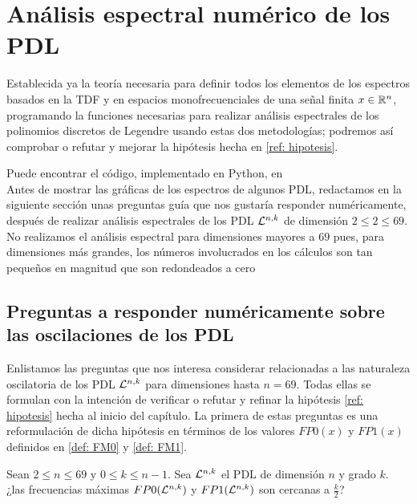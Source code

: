 \chapter{Análisis espectral numérico de los PDL}
\label{chap: resultados numericos analisis espectrales}

Establecida ya la teoría necesaria
para definir todos los elementos de los espectros
basados en la TDF y en espacios monofrecuenciales 
de una señal finita $x \in \mathbb{R}^{n}$,
programando la funciones necesarias para realizar análisis espectrales
de los polinomios discretos de Legendre
usando estas dos metodologías; podremos así
comprobar o refutar y mejorar
la hipótesis hecha en 
\ref{ref: hipotesis}. 

Puede encontrar el código, implementado en Python,
en  \\

Antes de mostrar las gráficas de los espectros
de algunos PDL, 
redactamos en la siguiente sección unas preguntas guía
que nos gustaría responder numéricamente, después de 
realizar análisis espectrales de los PDL
$\mathcal{L}^{n,k}$ de dimensión $2 \leq 2 \leq 69$. \\

No realizamos el análisis espectral para dimensiones
mayores a $69$ pues, para dimensiones más grandes, los números
involucrados en los cálculos son tan pequeños
en magnitud que son redondeados a cero

\section{Preguntas a responder numéricamente sobre las oscilaciones de los PDL}

Enlistamos las preguntas que nos interesa considerar
relacionadas a las naturaleza oscilatoria
de los PDL $\mathcal{L}^{n,k}$
para dimensiones hasta $n=69$. 
Todas ellas se formulan con la intención de 
verificar o refutar y refinar la 
hipótesis \ref{ref: hipotesis} 
hecha al inicio del capítulo. La primera
de estas preguntas es una reformulación
de dicha hipótesis
en términos de los 
valores $FP0(x)$ y $FP1(x)$ definidos en 
\ref{def: FM0} y \ref{def: FM1}.

\begin{pregunta}
\label{pregunta 1}
Sean $2 \leq n \leq 69$ y $0 \leq k \leq n-1$.
Sea $\mathcal{L}^{n,k}$ el PDL de dimensión $n$ y grado $k$.
¿las frecuencias máximas
$FP0(\mathcal{L}^{n,k})$ y 
$FP1(\mathcal{L}^{n,k})$ son cercanas a $\frac{k}{2}$?
\end{pregunta}

